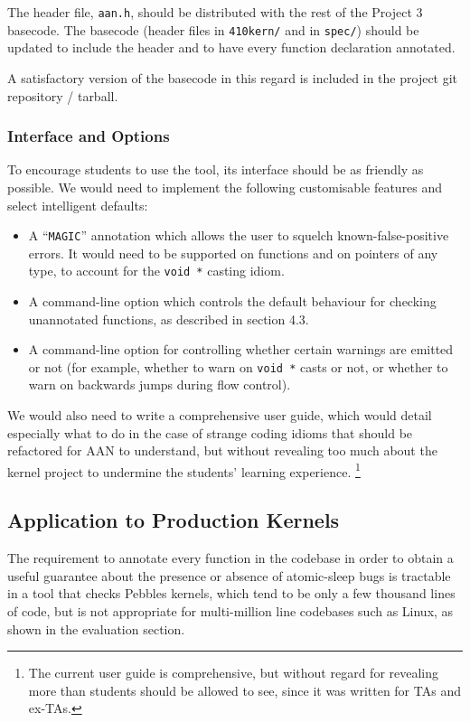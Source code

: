 \documentclass{article}
\begin{document}
The header file, \texttt{aan.h}, should be distributed with the rest of the Project 3 basecode.
The basecode (header files in \texttt{410kern/} and in \texttt{spec/}) should be updated to include the header and to have every function declaration annotated.

A satisfactory version of the basecode in this regard is included in the project git repository / tarball.

\subsubsection{Interface and Options}

To encourage students to use the tool, its interface should be as friendly as possible.
We would need to implement the following customisable features and select intelligent defaults:

\begin{itemize}
	\item A ``\texttt{MAGIC}'' annotation which allows the user to squelch known-false-positive errors. It would need to be supported on functions and on pointers of any type, to account for the \texttt{void *} casting idiom.
	\item A command-line option which controls the default behaviour for checking unannotated functions, as described in section 4.3.
	\item A command-line option for controlling whether certain warnings are emitted or not (for example, whether to warn on \texttt{void *} casts or not, or whether to warn on backwards jumps during flow control).
\end{itemize}

We would also need to write a comprehensive user guide, which would detail especially what to do in the case of strange coding idioms that should be refactored for AAN to understand, but without revealing too much about the kernel project to undermine the students' learning experience.
\footnote{The current user guide is comprehensive, but without regard for revealing more than students should be allowed to see, since it was written for TAs and ex-TAs.}

\subsection{Application to Production Kernels}

The requirement to annotate every function in the codebase in order to obtain a useful guarantee about the presence or absence of atomic-sleep bugs is tractable in a tool that checks Pebbles kernels, which tend to be only a few thousand lines of code, but is not appropriate for multi-million line codebases such as Linux, as shown in the evaluation section.
\end{document}
